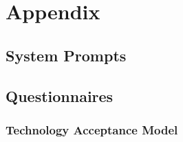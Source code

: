 \section*{Appendix}



\subsection*{System Prompts}



\clearpage



\newpage
\subsection*{Questionnaires}

\subsubsection*{Technology Acceptance Model}

